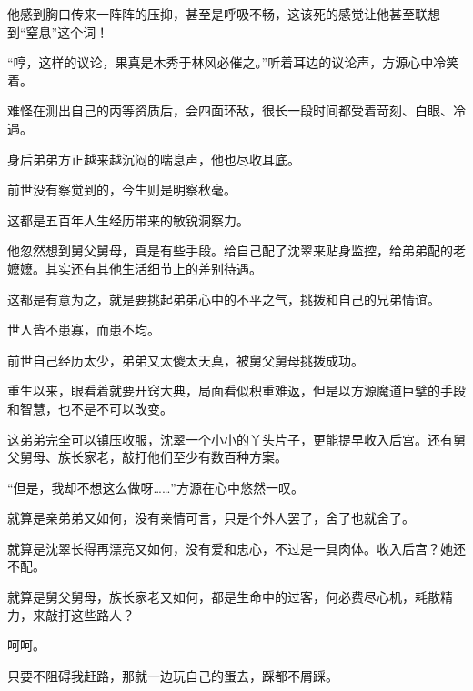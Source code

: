 \begin{this_body}
他感到胸口传来一阵阵的压抑，甚至是呼吸不畅，这该死的感觉让他甚至联想到“窒息”这个词！

“哼，这样的议论，果真是木秀于林风必催之。”听着耳边的议论声，方源心中冷笑着。

难怪在测出自己的丙等资质后，会四面环敌，很长一段时间都受着苛刻、白眼、冷遇。

身后弟弟方正越来越沉闷的喘息声，他也尽收耳底。

前世没有察觉到的，今生则是明察秋毫。

这都是五百年人生经历带来的敏锐洞察力。

他忽然想到舅父舅母，真是有些手段。给自己配了沈翠来贴身监控，给弟弟配的老嬷嬷。其实还有其他生活细节上的差别待遇。

这都是有意为之，就是要挑起弟弟心中的不平之气，挑拨和自己的兄弟情谊。

世人皆不患寡，而患不均。

前世自己经历太少，弟弟又太傻太天真，被舅父舅母挑拨成功。

重生以来，眼看着就要开窍大典，局面看似积重难返，但是以方源魔道巨擘的手段和智慧，也不是不可以改变。

这弟弟完全可以镇压收服，沈翠一个小小的丫头片子，更能提早收入后宫。还有舅父舅母、族长家老，敲打他们至少有数百种方案。

“但是，我却不想这么做呀……”方源在心中悠然一叹。

就算是亲弟弟又如何，没有亲情可言，只是个外人罢了，舍了也就舍了。

就算是沈翠长得再漂亮又如何，没有爱和忠心，不过是一具肉体。收入后宫？她还不配。

就算是舅父舅母，族长家老又如何，都是生命中的过客，何必费尽心机，耗散精力，来敲打这些路人？

呵呵。

只要不阻碍我赶路，那就一边玩自己的蛋去，踩都不屑踩。

\end{this_body}

